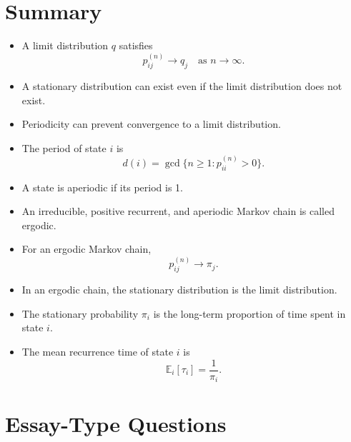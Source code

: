 \documentclass[12pt,a4paper]{article}
\theoremstyle{lecturestyle}
\newcommand{\E}{\mathbb{E}}
\begin{document}
\section{Summary}

\begin{itemize}[leftmargin=1.2cm]
    \item A limit distribution $q$ satisfies
    \[
    p_{ij}^{(n)}\to q_j
    \quad\text{as }n\to\infty.
    \]
    \item A stationary distribution can exist even if the limit distribution does not exist.
    \item Periodicity can prevent convergence to a limit distribution.
    \item The period of state $i$ is
    \[
    d(i)=\gcd\{n\geq1:p_{ii}^{(n)}>0\}.
    \]
    \item A state is aperiodic if its period is 1.
    \item An irreducible, positive recurrent, and aperiodic Markov chain is called ergodic.
    \item For an ergodic Markov chain,
    \[
    p_{ij}^{(n)}\to\pi_j.
    \]
    \item In an ergodic chain, the stationary distribution is the limit distribution.
    \item The stationary probability $\pi_i$ is the long-term proportion of time spent in state $i$.
    \item The mean recurrence time of state $i$ is
    \[
    \E_i[\tau_i]=\frac1{\pi_i}.
    \]
\end{itemize}

\section{Essay-Type Questions}
\end{document}

